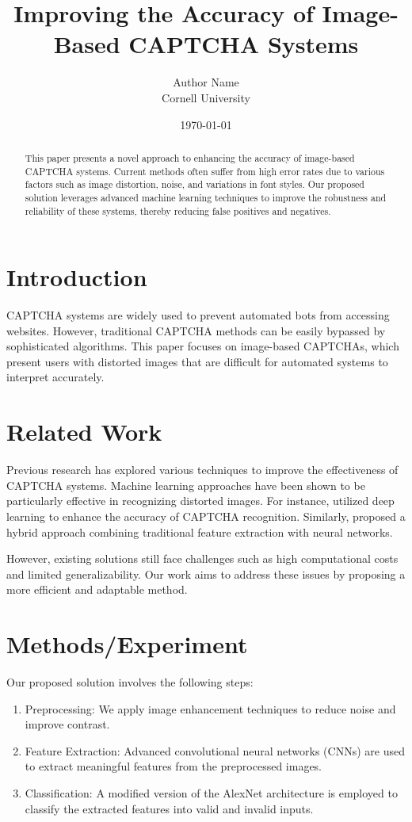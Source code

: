 \documentclass{article}
\title{Improving the Accuracy of Image-Based CAPTCHA Systems}
\author{Author Name \\ Cornell University}
\date{\today}
\begin{document}
\maketitle

\begin{abstract}
This paper presents a novel approach to enhancing the accuracy of image-based CAPTCHA systems. Current methods often suffer from high error rates due to various factors such as image distortion, noise, and variations in font styles. Our proposed solution leverages advanced machine learning techniques to improve the robustness and reliability of these systems, thereby reducing false positives and negatives.
\end{abstract}

\section{Introduction}
CAPTCHA systems are widely used to prevent automated bots from accessing websites. However, traditional CAPTCHA methods can be easily bypassed by sophisticated algorithms. This paper focuses on image-based CAPTCHAs, which present users with distorted images that are difficult for automated systems to interpret accurately.

\section{Related Work}
Previous research has explored various techniques to improve the effectiveness of CAPTCHA systems. Machine learning approaches have been shown to be particularly effective in recognizing distorted images. For instance, \cite{wang2015deep} utilized deep learning to enhance the accuracy of CAPTCHA recognition. Similarly, \cite{zhang2017captcha} proposed a hybrid approach combining traditional feature extraction with neural networks.

However, existing solutions still face challenges such as high computational costs and limited generalizability. Our work aims to address these issues by proposing a more efficient and adaptable method.

\section{Methods/Experiment}
Our proposed solution involves the following steps:
\begin{enumerate}
    \item Preprocessing: We apply image enhancement techniques to reduce noise and improve contrast.
    \item Feature Extraction: Advanced convolutional neural networks (CNNs) are used to extract meaningful features from the preprocessed images.
    \item Classification: A modified version of the AlexNet architecture is employed to classify the extracted features into valid and invalid inputs.
\end{enumerate}
\end{document}
